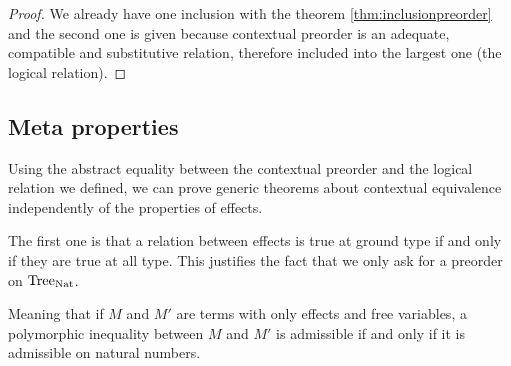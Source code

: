 \begin{atheorem}
\end{atheorem}

\begin{proof}
    We already have one inclusion with the theorem \ref{thm:inclusionpreorder}
    and the second one is given because 
    contextual preorder is an adequate, compatible and substitutive relation,
    therefore included into the largest one (the logical relation).
\end{proof}

\subsection{Meta properties}

Using the abstract equality between the contextual preorder
and the logical relation we defined, we can prove generic 
theorems about contextual equivalence independently 
of the properties of effects.

The first one is that a relation between effects is true 
at ground type if and only if they are true at all type. This 
justifies the fact that we only ask for a preorder on $\textnormal{Tree}_{\textnormal{Nat}}$.

\begin{atheorem}
    Meaning that if $M$ and $M'$ are terms with only effects and free 
    variables, a polymorphic inequality between $M$ and $M'$ is 
    admissible if and only if it is admissible on natural numbers. 
\end{atheorem}

